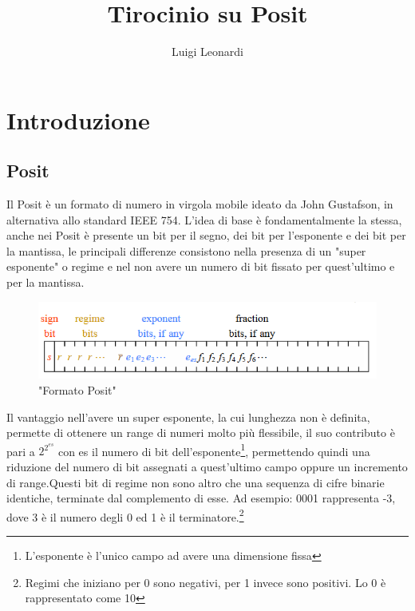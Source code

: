 \documentclass[a4paper,11pt]{article}
\author{Luigi Leonardi}
\title{Tirocinio su Posit}
\date{}
\begin{document}
	\maketitle
	\tableofcontents
	
	

\newpage
	\section{Introduzione}
	\subsection{Posit}

	Il Posit è un formato di numero in virgola mobile ideato da John Gustafson, in alternativa allo standard IEEE 754. L'idea di base è fondamentalmente la stessa, anche nei Posit è presente un bit per il segno, dei bit per l'esponente e dei bit per la mantissa, le principali differenze consistono nella presenza di un "super esponente" o regime e nel non avere un numero di bit fissato per quest'ultimo e per la mantissa. \\
	\begin{figure}[h]
	\includegraphics[scale=0.8]{posit}
	\centering
	\caption{"Formato Posit"}
	\end{figure}Il vantaggio nell'avere un super esponente, la cui lunghezza non è definita, permette di ottenere un range di numeri molto più flessibile, il suo contributo è pari a $2^{2^{es}}$ con es il numero di bit dell'esponente\footnote{L'esponente è l'unico campo ad avere una dimensione fissa}, permettendo quindi una riduzione del numero di bit assegnati a quest'ultimo campo oppure un incremento di range.\newline Questi bit di regime non sono altro che una sequenza di cifre binarie identiche, terminate dal complemento di esse. \newline Ad esempio: 0001 rappresenta -3, dove 3 è il numero degli 0 ed 1 è il terminatore.\footnote{Regimi che iniziano per 0 sono negativi, per 1 invece sono positivi. Lo 0 è rappresentato come 10}\cite{epfl1}
	
\end{document}
